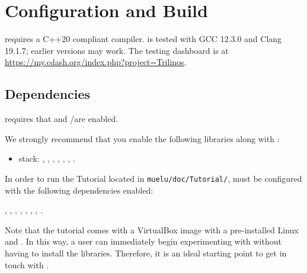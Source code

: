 \section{Configuration and Build}
\label{sec:configuration and build}

\muelu{} requires a C++20 compliant compiler.
\trilinos{} is tested with GCC 12.3.0 and Clang 19.1.7; earlier versions may work.
The \trilinos{} testing dashboard is at \url{https://my.cdash.org/index.php?project=Trilinos}.

\subsection{Dependencies}


\muelu{} requires that \teuchos{} and \tpetra/\ifpacktwo are enabled.


We strongly recommend that you enable the following \trilinos libraries along with \muelu:

\begin{itemize}
  \item \tpetra stack: \amesostwo, \belos, \galeri, \ifpacktwo, \tpetra, \zoltan, \zoltantwo.
\end{itemize}


In order to run the \muelu{} Tutorial \cite{MueLuTutorial} located in \verb!muelu/doc/Tutorial/!, \muelu{} must be configured with the following
dependencies enabled:

  \amesostwo, \belos, \ifpacktwo, \galeri, \tpetra, \xpetra, \zoltan, \zoltantwo.

\begin{mycomment}
Note that the \muelu{} tutorial \cite{MueLuTutorial} comes with a VirtualBox image with a pre-installed
Linux and \trilinos{}.   In this way, a user can immediately begin experimenting with \muelu{} without
having to install the \trilinos{} libraries. Therefore, it is an ideal starting point to get in touch with \muelu{}.
\end{mycomment}


